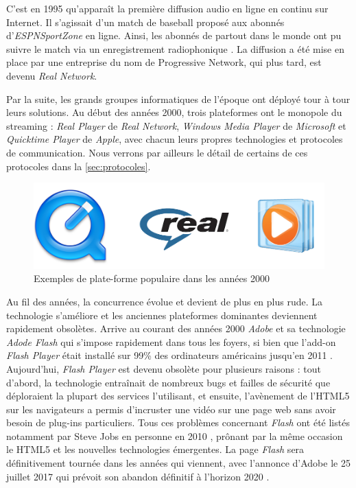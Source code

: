 \documentclass{polytech/polytech}
\begin{document}
C’est en 1995 qu’apparaît la première diffusion audio en ligne en continu sur Internet. Il s’agissait d’un match de baseball proposé aux abonnés d’\textit{ESPNSportZone} en ligne. Ainsi, les abonnés de partout dans le monde ont pu suivre le match via un enregistrement radiophonique \cite{zambelli_history_2013}. La diffusion a été mise en place par une entreprise du nom de Progressive Network, qui plus tard, est devenu \textit{Real Network}.

Par la suite, les grands groupes informatiques de l’époque ont déployé tour à tour leurs solutions. Au début des années 2000, trois plateformes ont le monopole du streaming : \textit{Real Player} de \textit{Real Network}, \textit{Windows Media Player} de \textit{Microsoft} et \textit{Quicktime Player} de \textit{Apple}, avec chacun leurs propres technologies et protocoles de communication. Nous verrons par ailleurs le détail de certains de ces protocoles dans la \autoref{sec:protocoles}.

\begin{figure}
	\includegraphics[scale=0.70]{images/logos_platform.png}
	\caption{Exemples de plate-forme populaire dans les années 2000}
	\label{fig:logoPlatform}
\end{figure}

Au fil des années, la concurrence évolue et devient de plus en plus rude. La technologie s’améliore et les anciennes plateformes dominantes deviennent rapidement obsolètes. Arrive au courant des années 2000 \textit{Adobe} et sa technologie \textit{Adode Flash} qui s’impose rapidement dans tous les foyers, si bien que l’add-on \textit{Flash Player} était installé sur 99\% des ordinateurs américains jusqu’en 2011 \cite{_chronique_streaming_2010}. Aujourd’hui, \textit{Flash Player} est devenu obsolète pour plusieurs raisons : tout d’abord, la technologie entraînait de nombreux bugs et failles de sécurité que déploraient la plupart des services l’utilisant, et ensuite, l’avènement de l’HTML5 sur les navigateurs a permis d’incruster une vidéo sur une page web sans avoir besoin de plug-ins particuliers. Tous ces problèmes concernant \textit{Flash} ont été listés notamment par Steve Jobs en personne en 2010 \cite{_thoughts_2010}, prônant par la même occasion le HTML5 et les nouvelles technologies émergentes. La page \textit{Flash} sera définitivement tournée dans les années qui viennent, avec l’annonce d’Adobe le 25 juillet 2017 qui prévoit son abandon définitif à l’horizon 2020 \cite{_flash_2017}.
\end{document}
